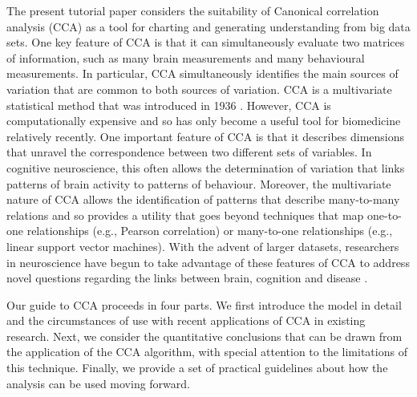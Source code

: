 The present tutorial paper considers the suitability of Canonical correlation analysis (CCA) as a tool for charting and generating understanding from big data sets. One key feature of CCA is that it can simultaneously evaluate two matrices of information, such as many brain measurements and many behavioural measurements. In particular, CCA simultaneously identifies the main sources of variation that are common to both sources of variation. CCA is a multivariate statistical method that was introduced in 1936 \cite{Hotelling1936}. However, CCA is computationally expensive and so has only become a useful tool for biomedicine relatively recently. One important feature of CCA is that it describes dimensions that unravel the correspondence between two different sets of variables. In cognitive neuroscience, this often allows the determination of variation that links patterns of brain activity to patterns of behaviour. Moreover, the multivariate nature of CCA allows the identification of patterns that describe many-to-many relations and so provides a utility that goes beyond techniques that map one-to-one relationships (e.g., Pearson correlation) or many-to-one relationships (e.g., linear support vector machines). With the advent of larger datasets, researchers in neuroscience have begun to take advantage of these features of CCA to address novel questions regarding the links between brain, cognition and disease \cite{Marquand2017, Smith2015,Tsvetanov2016,VatanseverNI2017,WangPsychScience2018,WangNI2018}. 

Our guide to CCA proceeds in four parts. We first introduce the model in detail and the circumstances of use with recent applications of CCA in existing research. Next, we consider the quantitative conclusions that can be drawn from the application of the CCA algorithm, with special attention to the limitations of this technique. Finally, we provide a set of practical guidelines about how the analysis can be used moving forward.


